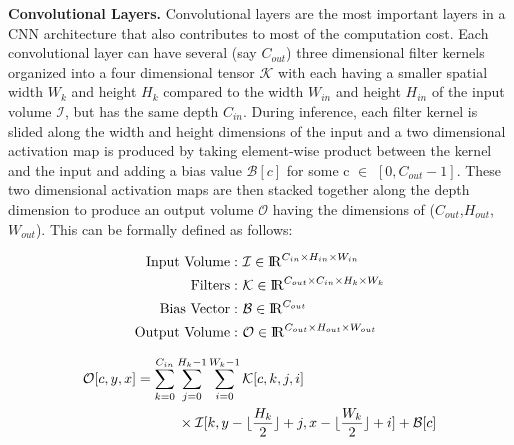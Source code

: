 \vspace{2mm}
\noindent \textbf{Convolutional Layers.} Convolutional layers are the most important layers in a CNN architecture that also contributes to most of the computation cost. Each convolutional layer can have several (say $C_{out}$) three dimensional filter kernels organized into a four dimensional tensor $\mathcal{K}$ with each having a smaller spatial width $W_k$ and height $H_k$ compared to the width $W_{in}$ and height $H_{in}$ of the input volume $\mathcal{I}$, but has the same depth $C_{in}$. During inference, each filter kernel is slided along the width and height dimensions of the input and a two dimensional activation map is produced by taking element-wise product between the kernel and the input and adding a bias value $\mathcal{B}[c]$ for some c $\in$ $[0, C_{out}-1]$. These two dimensional activation maps are then stacked together along the depth dimension to produce an output volume $\mathcal{O}$ having the dimensions of ($C_{out}$,$H_{out}$,$W_{out}$). This can be formally defined as follows:

\vspace{-2mm}
\begin{align}
\text{Input Volume}:&~ \mathcal{I} \in \mathcal{\rm I\!R}^{C_{in} \times H_{in} \times W_{in}}\\
\text{Filters}:&~ \mathcal{K} \in \mathcal{\rm I\!R}^{C_{out} \times C_{in} \times H_{k} \times W_{k}}\\
\text{Bias Vector}:&~ \mathcal{B} \in \mathcal{\rm I\!R}^{C_{out}}\\
\text{Output Volume}:&~ \mathcal{O} \in \mathcal{\rm I\!R}^{C_{out} \times H_{out} \times W_{out}}
\end{align}

\begin{equation}
\label{eqn:conv_operator}
\begin{split}
\mathcal{O}[c,y,x] &= \sum_{k=0}^{C_{in}} \sum_{j=0}^{H_k-1} \sum_{i=0}^{W_k-1} \mathcal{K}[c, k, j, i] \\ & \quad \quad \quad \times \mathcal{I}[k,y-\lfloor\frac{H_k}{2}\rfloor+j,x-\lfloor\frac{W_k}{2}\rfloor+i] + \mathcal{B}[c]
\end{split}
\end{equation}


